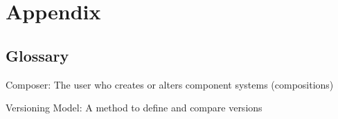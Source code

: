 \chapter{Appendix}

\section{Glossary}
Composer: The user who creates or alters component systems (compositions)

Versioning Model: A method to define and compare versions
